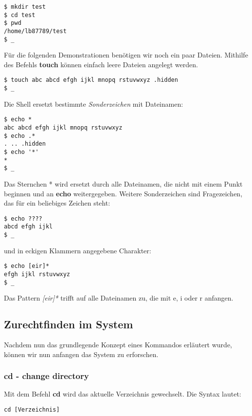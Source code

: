 \documentclass[titlepage,a4paper]{article}
\begin{document}
\begin{verbatim}
$ mkdir test
$ cd test
$ pwd
/home/lb87789/test
$ _
\end{verbatim}

Für die folgenden Demonstrationen benötigen wir noch ein paar Dateien.
Mithilfe des Befehls \textbf{touch} können einfach leere Dateien angelegt werden.

\begin{verbatim}
$ touch abc abcd efgh ijkl mnopq rstuvwxyz .hidden
$ _
\end{verbatim}

Die Shell ersetzt bestimmte \emph{Sonderzeichen} mit Dateinamen:

\begin{verbatim}
$ echo *
abc abcd efgh ijkl mnopq rstuvwxyz
$ echo .*
. .. .hidden
$ echo '*'
*
$ _
\end{verbatim}

Das Sternchen * wird ersetzt durch alle Dateinamen, die nicht mit einem Punkt
beginnen und an \textbf{echo} weitergegeben.  Weitere Sonderzeichen sind
Fragezeichen, das für ein beliebiges Zeichen steht:

\begin{verbatim}
$ echo ????
abcd efgh ijkl
$ _
\end{verbatim}

und in eckigen Klammern angegebene Charakter:

\begin{verbatim}
$ echo [eir]*
efgh ijkl rstuvwxyz
$ _
\end{verbatim}

Das Pattern \emph{[eir]*} trifft auf alle Dateinamen zu, die mit e, i oder r anfangen.

\subsection{Zurechtfinden im System}

Nachdem nun das grundlegende Konzept eines Kommandos erläutert wurde, können
wir nun anfangen das System zu erforschen.

\subsubsection*{cd - change directory}
\label{sec:cd}

Mit dem Befehl \textbf{cd} wird das aktuelle Verzeichnis gewechselt.  Die
Syntax lautet:

\begin{verbatim}
cd [Verzeichnis]
\end{verbatim}
\end{document}
